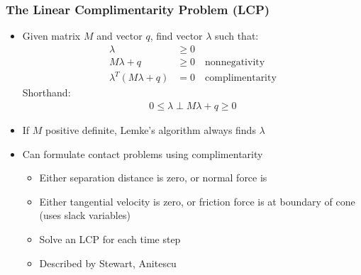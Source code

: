 \documentclass{beamer}
\begin{document}
\begin{frame}
    \frametitle{The Linear Complimentarity Problem (LCP)}
    \begin{itemize}
        \item Given matrix $M$ and vector $q$, find vector $\lambda$ such that:
        \begin{align*}
            \lambda &\geq 0 \\
            M\lambda + q &\geq 0 \quad \textrm{nonnegativity} \\
            \lambda^T (M \lambda + q) &= 0  \quad \textrm{complimentarity}
        \end{align*}
        \centering Shorthand:
        \begin{align*}
            0 \leq \lambda \perp M \lambda + q \geq 0
        \end{align*}
        \item If $M$ positive definite, Lemke's algorithm always finds $\lambda$
        \item Can formulate contact problems using complimentarity
            \begin{itemize}
                \item Either separation distance is zero, or normal force is
                \item Either tangential velocity is zero, or friction force is at boundary of cone (uses slack variables)
                \item Solve an LCP for each time step
                \item Described by Stewart, Anitescu
            \end{itemize}
    \end{itemize}
\end{frame}
\end{document}
